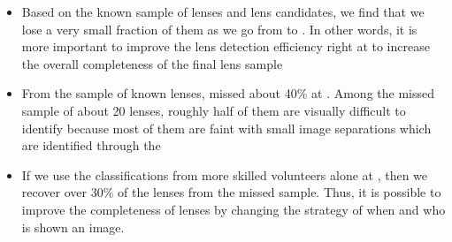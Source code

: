 \documentclass[useAMS,usenatbib,a4paper]{mn2e}
\begin{document}
\begin{itemize}
\item Based on the known sample of lenses and lens candidates, we find
that we lose a very small fraction of them as we go from \StageOne to
\StageTwo. In other words, it is more important to improve the lens
detection efficiency right at \StageOne to increase the overall
completeness of the final lens sample

\item From the sample of known lenses, \sw missed about 40\% at \StageOne.
Among the missed sample of about 20 lenses, roughly half of them are
visually difficult to identify because most of them are faint with small
image separations which are identified through the \rf

\item If we use the classifications from more skilled volunteers alone
at \StageOne, then we recover over 30\% of the lenses from the missed
sample. Thus, it is possible to improve the completeness of lenses by
changing the strategy of when and who is shown an image.

\end{itemize}
\end{document}
